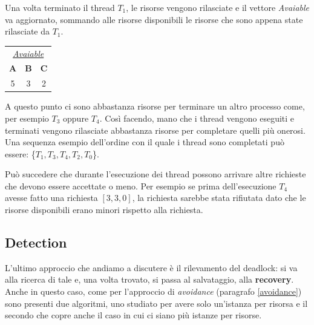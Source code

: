\pagebreak Una volta terminato il thread $T_1$, le risorse vengono rilasciate e il vettore \textit{Avaiable} va aggiornato, sommando alle risorse disponibili le risorse che sono appena state rilasciate da $T_1$.
\begin{table}[h!]
    \centering
    \begin{tabular}{c c c}
         \multicolumn{3}{c}{\underline{\textit{Avaiable}}} \\
         \textbf{A} & \textbf{B} & \textbf{C} \\
         5 & 3 & 2
    \end{tabular}
\end{table}

A questo punto ci sono abbastanza risorse per terminare un altro processo come, per esempio $T_3$ oppure $T_4$. Così facendo, mano che i thread vengono eseguiti e terminati vengono rilasciate abbastanza risorse per completare quelli più onerosi. Una sequenza esempio dell'ordine con il quale i thread sono completati può essere: \{$T_1,T_3,T_4,T_2,T_0$\}. 

Può succedere che durante l'esecuzione dei thread possono arrivare altre richieste che devono essere accettate o meno. Per esempio se prima dell'esecuzione $T_4$ avesse fatto una richiesta $[3,3,0]$, la richiesta sarebbe stata rifiutata dato che le risorse disponibili erano minori rispetto alla richiesta.
% 
\subsection{Detection}
L'ultimo approccio che andiamo a discutere è il rilevamento del deadlock: si va alla ricerca di tale e, una volta trovato, si passa al salvataggio, alla \textbf{recovery}. Anche in questo caso, come per l'approccio di \textit{avoidance} (paragrafo \ref{avoidance}) sono presenti due algoritmi, uno studiato per avere solo un'istanza per risorsa e il secondo che copre anche il caso in cui ci siano più istanze per risorse.



